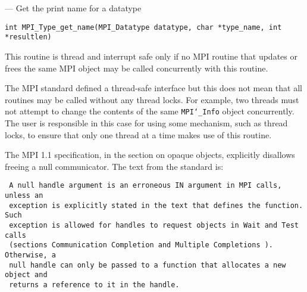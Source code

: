 \startmanpage
{}
--- Get the print name for a datatype 
\startvb\begin{verbatim}
int MPI_Type_get_name(MPI_Datatype datatype, char *type_name, int *resultlen)

\end{verbatim}
\endvb

\par
{}
\par
\par
{}
\par
This routine is thread and interrupt safe only if no MPI routine that
updates or frees the same MPI object may be called concurrently
with this routine.
\par
The MPI standard defined a thread-safe interface but this does not
mean that all routines may be called without any thread locks.  For
example, two threads must not attempt to change the contents of the
same {\tt MPI{\tt \char`\_}Info} object concurrently.  The user is responsible in this
case for using some mechanism, such as thread locks, to ensure that
only one thread at a time makes use of this routine.
\par
\par
{}
The MPI 1.1 specification, in the section on opaque objects, explicitly
disallows freeing a null communicator.  The text from the standard is:
\begin{verbatim}
 A null handle argument is an erroneous IN argument in MPI calls, unless an
 exception is explicitly stated in the text that defines the function. Such
 exception is allowed for handles to request objects in Wait and Test calls
 (sections Communication Completion and Multiple Completions ). Otherwise, a
 null handle can only be passed to a function that allocates a new object and
 returns a reference to it in the handle.
\end{verbatim}

